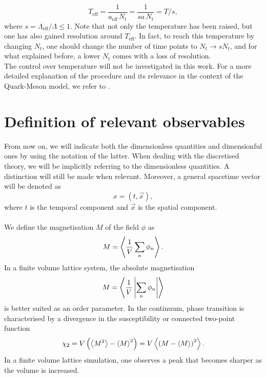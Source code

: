 \begin{equation*}
    T_\text{eff} = \frac{1}{a_\text{eff} \, N_t} = \frac{1}{sa \, N_t} = T / s, 
\end{equation*}
where $s = \Lambda_\text{eff} / \Lambda \leq 1$. Note that not only the temperature has been raised, but one has also gained resolution around $T_\text{eff}$. In fact, to reach this temperature by changing $N_t$, one should change the number of time points to $N_t \to s N_t$, and for what explained before, a lower $N_t$ comes with a loss of resolution. \\
The control over temperature will not be investigated in this work. For a more detailed explanation of the procedure and its relevance in the context of the Quark-Meson model, we refer to \cite{attanasio2022low}.
\section{Definition of relevant observables}
\label{sec:observables}
From now on, we will indicate both the dimensionless quantities and dimensionful ones by using the notation of the latter. When dealing with the discretised theory, we will be implicitly referring to the dimensionless quantities. A distinction will still be made when relevant. Moreover, a general spacetime vector 
will be denoted as 
\begin{equation*}
    x = (t, \vec{x}),
\end{equation*}
where $t$ is the temporal component and $\vec{x}$ is the spatial component. \\~\\
We define the magnetisation $M$ of the field $\phi$ as
\begin{equation*}
    M = \left\langle \frac{1}{V}\sum_n \phi_n \right\rangle.
\end{equation*}
In a finite volume lattice system, the absolute magnetisation
\begin{equation*}
    M = \left\langle \frac{1}{V}\left|\sum_n \phi_n\right| \right\rangle
\end{equation*}
is better suited \cite{friedli_velenik_2017,gattringer_LQCD} as an order parameter. 
In the continuum, phase transition is characterised by a divergence in the susceptibility or connected two-point function
\begin{equation*}
    \chi_2 = V \left(\left\langle M^2 \right\rangle - \left\langle M \right\rangle^2\right) = V \left\langle \left(M-\left\langle M \right\rangle\right)^2 \right\rangle.
\end{equation*}
In a finite volume lattice simulation, one observes a peak that becomes sharper as the volume is increased. \\
